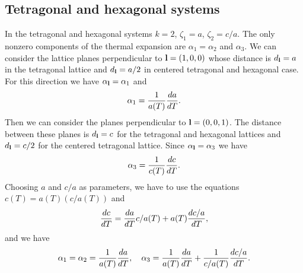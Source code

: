 \documentclass[12pt,a4paper]{article}
\begin{document}
\subsection{\color{web-blue}Tetragonal and hexagonal systems}
In the tetragonal and hexagonal systems $k=2$, $\zeta_1=a$, $\zeta_2=c/a$.
The only nonzero components of the thermal expansion are 
$\alpha_{1}=\alpha_{2}$ and $\alpha_{3}$. We can consider the
lattice planes perpendicular to ${\bf l}=(1,0,0)$ whose distance
is $d_{\bf l}=a$ in the tetragonal lattice and $d_{\bf l}=a/2$ in 
centered tetragonal and hexagonal case. 
For this direction we have $\alpha_{\bf l}=\alpha_1$ and 
\begin{equation}
\alpha_1 = {1\over a(T)} {d a \over dT}.
\end{equation}
Then we can consider the planes perpendicular to ${\bf l}=(0,0,1)$.
The distance between these planes is $d_{\bf l}=c$ for the 
tetragonal and hexagonal lattices and $d_{\bf l}=c/2$ for the 
centered tetragonal lattice. Since $\alpha_{\bf l}=\alpha_3$ we have
\begin{equation}
\alpha_3 = {1\over c(T)} {d c \over dT}. 
\end{equation}
Choosing $a$ and $c/a$ as parameters,
we have to use the equations $c(T)=a(T) (c/a(T))$ and 
\begin{equation}
{dc \over d T} = {da \over d T} c/a(T) + a(T) {d c/a \over dT},
\end{equation}
and we have
\begin{equation}
\alpha_1 = \alpha_2= {1\over a(T)} {d a \over dT}, \ \ \ 
\alpha_3 = {1\over a(T)} {da \over d T}  + {1\over c/a(T)} {d c/a \over dT}.
\end{equation}
\end{document}
